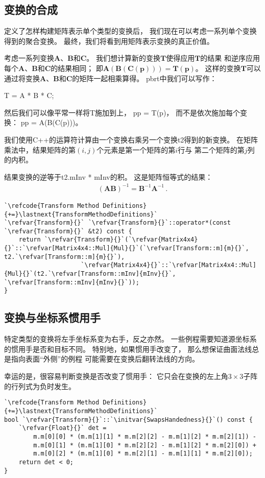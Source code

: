 \subsection{变换的合成}\label{sub:变换的合成}
定义了怎样构建矩阵表示单个类型的变换后，
我们现在可以考虑一系列单个变换得到的聚合变换。
最终，我们将看到用矩阵表示变换的真正价值。

考虑一系列变换$\bm A$、$\bm B$和$\bm C$。
我们想计算新的变换$\bm T$使得应用$\bm T$的结果
和逆序应用每个$\bm A$、$\bm B$和$\bm C$的结果相同；
即$\bm A(\bm B(\bm C(\bm p)))=\bm T(\bm p)$。
这样的变换$\bm T$可以通过将变换$\bm A$、$\bm B$和$\bm C$的矩阵一起相乘算得。
pbrt中我们可以写作：

{\ttfamily\indent {} T = A * B * C;}

然后我们可以像平常一样将{\ttfamily T}施加到上，
{\ttfamily{} pp = T(p)}，
而不是依次施加每个变换：{\ttfamily{} pp = A(B(C(p)))}。

我们使用C++的{\ttfamily *}运算符计算由一个变换右乘另一个变换{\ttfamily t2}得到的新变换。
在矩阵乘法中，结果矩阵的第$(i,j)$个元素是第一个矩阵的第$i$行与
第二个矩阵的第$j$列的内积。

结果变换的逆等于{\ttfamily t2.mInv * mInv}的积。
这是矩阵恒等式的结果：
\begin{align*}
    (\bm A\bm B)^{-1}=\bm B^{-1}\bm A^{-1}\, .
\end{align*}

\begin{lstlisting}
`\refcode{Transform Method Definitions}{+=}\lastnext{TransformMethodDefinitions}`
`\refvar{Transform}{}` `\refvar{Transform}{}`::operator*(const `\refvar{Transform}{}` &t2) const {
    return `\refvar{Transform}{}`(`\refvar{Matrix4x4}{}`::`\refvar[Matrix4x4::Mul]{Mul}{}`(`\refvar[Transform::m]{m}{}`, t2.`\refvar[Transform::m]{m}{}`),
                     `\refvar{Matrix4x4}{}`::`\refvar[Matrix4x4::Mul]{Mul}{}`(t2.`\refvar[Transform::mInv]{mInv}{}`, `\refvar[Transform::mInv]{mInv}{}`));
}
\end{lstlisting}

\subsection{变换与坐标系惯用手}\label{sub:变换与坐标系惯用手}
特定类型的变换将左手坐标系变为右手，反之亦然。
一些例程需要知道源坐标系的惯用手是否和目标不同。
特别地，如果惯用手改变了，
那么想保证曲面法线总是指向表面“外侧”的例程
可能需要在变换后翻转法线的方向。

幸运的是，很容易判断变换是否改变了惯用手：
它只会在变换的左上角$3\times3$子阵的行列式为负时发生。
\begin{lstlisting}
`\refcode{Transform Method Definitions}{+=}\lastnext{TransformMethodDefinitions}`
bool `\refvar{Transform}{}`::`\initvar{SwapsHandedness}{}`() const {
    `\refvar{Float}{}` det = 
        m.m[0][0] * (m.m[1][1] * m.m[2][2] - m.m[1][2] * m.m[2][1]) -
        m.m[0][1] * (m.m[1][0] * m.m[2][2] - m.m[1][2] * m.m[2][0]) +
        m.m[0][2] * (m.m[1][0] * m.m[2][1] - m.m[1][1] * m.m[2][0]);
    return det < 0;
}
\end{lstlisting}